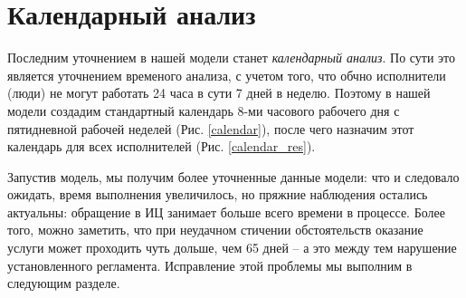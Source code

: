 \chapter{Календарный анализ}

Последним уточнением в нашей модели станет \textit{календарный
анализ}. По сути это является уточнением временого анализа,
с учетом того, что обчно исполнители (люди) не могут
работать 24 часа в сути 7 дней в неделю. Поэтому в нашей
модели создадим стандартный календарь 8-ми часового рабочего
дня с пятидневной рабочей неделей (Рис. \ref{calendar}),
после чего назначим этот календарь для всех исполнителей
(Рис. \ref{calendar_res}).

Запустив модель, мы получим более уточненные данные модели:
что и следовало ожидать, время выполнения увеличилось, но
пряжние наблюдения остались актуальны: обращение в ИЦ занимает
больше всего времени в процессе. Более того, можно заметить,
что при неудачном стичении обстоятельств оказание услуги
может проходить чуть дольше, чем 65 дней -- а это между тем
нарушение установленного регламента. Исправление этой
проблемы мы выполним в следующим разделе.

